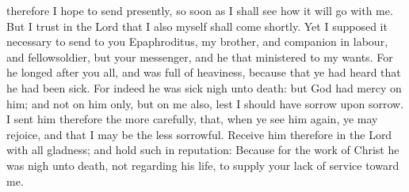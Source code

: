 {therefore I
hope to
send
presently, so soon
as I shall
see how it will go with me.
But I
trust
in the
Lord
that
I
also
myself shall
come
shortly.
Yet I supposed
it
necessary to
send
to
you
Epaphroditus,
my
brother,
and companion in
labour,
and
fellowsoldier,
but
your
messenger,
and he that
ministered
to
my
wants.
For he longed
after
you
all,
and was full of
heaviness, because
that ye had
heard
that he had been
sick.
For
indeed he was
sick nigh
unto
death:
but
God had mercy
on
him;
and
not on
him
only,
but on
me
also,
lest I should
have
sorrow
upon
sorrow.
I
sent
him
therefore the more
carefully,
that, when ye
see
him
again, ye may
rejoice, and that
I may
be the less
sorrowful.
Receive
him
therefore
in the
Lord
with
all
gladness;
and
hold
such in
reputation:
Because
for the
work of
Christ he was
nigh
unto
death, not
regarding his
life, to
supply
your
lack of
service
toward
me.

}
